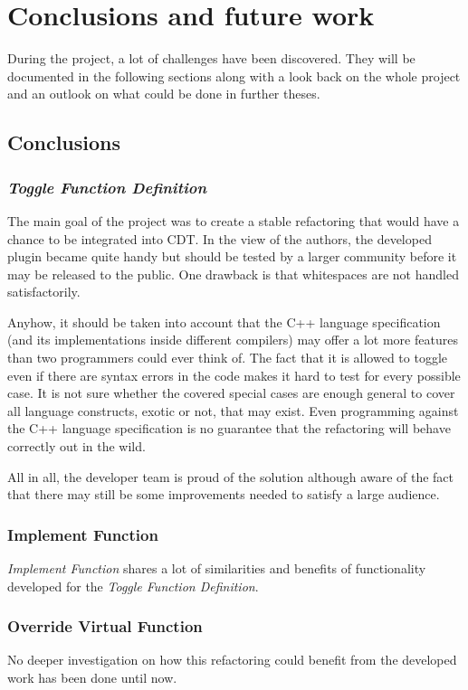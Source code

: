 \chapter{Conclusions and future work}
\thispagestyle{fancy}

During the project, a lot of challenges have been discovered. They will be 
documented in the following sections along with a look back on the whole project 
and an outlook on what could be done in further theses. 

\section{Conclusions}

\subsection{\textit{Toggle Function Definition}}
The main goal of the project was to create a stable refactoring that would have 
a chance to be integrated into CDT. In the view of the authors, the developed 
plugin became quite handy but should be tested by a larger community before it 
may be released to the public. One drawback is that whitespaces are not handled 
satisfactorily.

Anyhow, it should be taken into account that the C++ language specification (and 
its implementations inside different compilers) may offer a lot more features 
than two programmers could ever think of. The fact that it is allowed to toggle 
even if there are syntax errors in the code makes it hard to test for every 
possible case. It is not sure whether the covered special cases are enough 
general to cover all language constructs, exotic or not, that may exist. Even 
programming against the C++ language specification is no guarantee that the 
refactoring will behave correctly out in the wild.

All in all, the developer team is proud of the solution although aware of the 
fact that there may still be some improvements needed to satisfy a large 
audience.

\subsection{Implement Function}
\textit{Implement Function} shares a lot of similarities and benefits of
functionality developed for the \textit{Toggle Function Definition}.


\subsection{Override Virtual Function}
No deeper investigation on how this refactoring could benefit from the developed 
work has been done until now.

